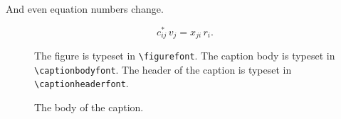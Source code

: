  And even equation numbers change.

\begin{equation}
  \label{eq:1in1}
   c_{ij}^{\ast}\, v_{j} = x_{ji}\, r_{i}. 
\end{equation}

\begin{figure}[htbp]
  \begin{center}
    \leavevmode
    The figure is typeset in \verb|\figurefont|.
    The caption body is typeset in \verb|\captionbodyfont|.
    The header of the caption is typeset in \verb|\captionheaderfont|.
  \end{center}
  \caption{The body of the caption.}
\end{figure}








